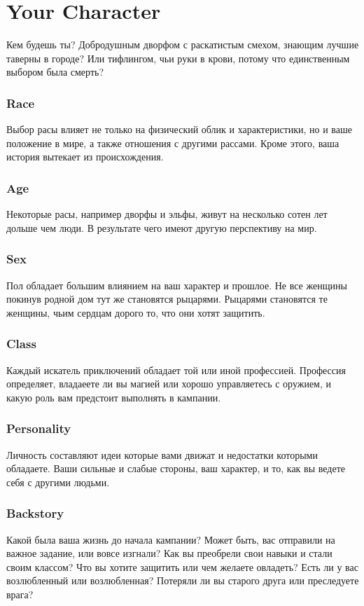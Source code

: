 \documentclass[a5paper,11pt]{book}
\begin{document}
\chapter{Your Character}
\begin{multicols}{2}
\lettrine{К}{}ем будешь ты? Добродушным дворфом с раскатистым смехом, знающим лучшие таверны в городе? Или тифлингом, чьи руки в крови, потому что единственным выбором была смерть?

\subsection{Race}
Выбор расы влияет не только на физический облик и характеристики, но и ваше положение в мире, а также отношения с другими рассами. Кроме этого, ваша история вытекает из происхождения.

\subsection{Age}
Некоторые расы, например дворфы и эльфы, живут на несколько сотен лет дольше чем люди. В результате чего имеют другую перспективу на мир.

\subsection{Sex}
Пол обладает большим влиянием на ваш характер и прошлое. Не все женщины покинув родной дом тут же становятся рыцарями. Рыцарями становятся те женщины, чьим сердцам дорого то, что они хотят защитить.

\subsection{Class}
Каждый искатель приключений обладает той или иной профессией. Профессия определяет, владаеете ли вы магией или хорошо управляетесь с оружием, и какую роль вам предстоит выполнять в кампании.

\subsection{Personality}
Личность составляют идеи которые вами движат и недостатки которыми обладаете. Ваши сильные и слабые стороны, ваш характер, и то, как вы ведете себя с другими людьми.

\subsection{Backstory}
Какой была ваша жизнь до начала кампании? Может быть, вас отправили на важное задание, или вовсе изгнали? Как вы преобрели свои навыки и стали своим классом? Что вы хотите защитить или чем желаете овладеть? Есть ли у вас возлюбленный или возлюбленная? Потеряли ли вы старого друга или преследуете врага?


\end{multicols}
\end{document}
